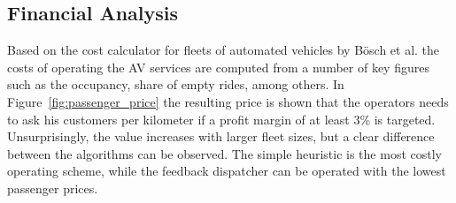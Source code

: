 \subsection{Financial Analysis}
\label{sec:cost_analysis}

Based on the cost calculator for fleets of automated vehicles by Bösch et al. \cite{Bosch2016a}
 the costs of operating the AV services are computed from a number of key figures
 such as the occupancy, share of empty rides, among others. In Figure~\ref{fig:passenger_price}
 the resulting price is shown that the operators needs to ask his customers per
 kilometer if a profit margin of at least 3\% is targeted. Unsurprisingly, the value
  increases with larger fleet sizes, but a clear difference
between the algorithms can be observed. The simple heuristic is the most
costly operating scheme, while the feedback dispatcher can be operated with the
lowest passenger prices.


\captionsetup[subfigure]{width=0.9\textwidth}


